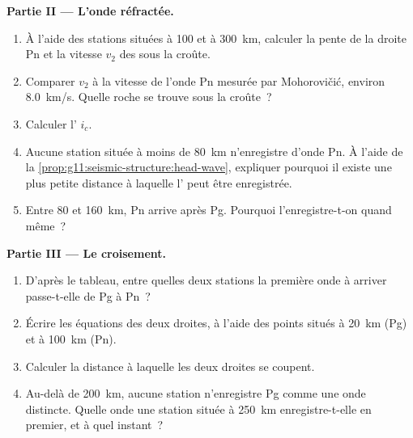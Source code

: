 \begin{problem}
\medskip
\noindent\textbf{Partie II --- L'onde réfractée.}
\begin{enumerate}[resume]
  \item À l'aide des stations situées à 100 et à \qty{300}{km}, calculer la
        pente de la droite Pn et la vitesse $v_2$ des  sous la croûte.
  \item Comparer $v_2$ à la vitesse de l'onde Pn mesurée par Mohorovičić,
        environ \qty{8.0}{km/s}. Quelle roche se trouve sous la croûte~?
  \item Calculer l' $i_c$.
  \item Aucune station située à moins de \qty{80}{km} n'enregistre d'onde
        Pn. À l'aide de la \cref{prop:g11:seismic-structure:head-wave},
        expliquer pourquoi il existe une plus petite distance à laquelle
        l' peut être enregistrée.
  \item Entre 80 et \qty{160}{km}, Pn arrive après Pg. Pourquoi
        l'enregistre-t-on quand même~?
\end{enumerate}

\medskip
\noindent\textbf{Partie III --- Le croisement.}
\begin{enumerate}[resume]
  \item D'après le tableau, entre quelles deux stations la première onde à
        arriver passe-t-elle de Pg à Pn~?
  \item Écrire les équations des deux droites, à l'aide des points situés à
        \qty{20}{km} (Pg) et à \qty{100}{km} (Pn).
  \item Calculer la distance à laquelle les deux droites se coupent.
  \item Au-delà de \qty{200}{km}, aucune station n'enregistre Pg comme une
        onde distincte. Quelle onde une station située à \qty{250}{km}
        enregistre-t-elle en premier, et à quel instant~?
\end{enumerate}


\end{problem}
